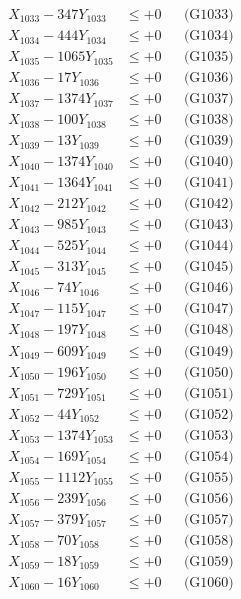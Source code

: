 \documentclass[a4paper,10pt]{article}
\begin{document}
{\begin{align}
X_{1033} - 347Y_{1033} &\leq +0 && \text{(G1033)} \\
X_{1034} - 444Y_{1034} &\leq +0 && \text{(G1034)} \\
X_{1035} - 1065Y_{1035} &\leq +0 && \text{(G1035)} \\
X_{1036} - 17Y_{1036} &\leq +0 && \text{(G1036)} \\
X_{1037} - 1374Y_{1037} &\leq +0 && \text{(G1037)} \\
X_{1038} - 100Y_{1038} &\leq +0 && \text{(G1038)} \\
X_{1039} - 13Y_{1039} &\leq +0 && \text{(G1039)} \\
X_{1040} - 1374Y_{1040} &\leq +0 && \text{(G1040)} \\
\allowbreak
X_{1041} - 1364Y_{1041} &\leq +0 && \text{(G1041)} \\
X_{1042} - 212Y_{1042} &\leq +0 && \text{(G1042)} \\
X_{1043} - 985Y_{1043} &\leq +0 && \text{(G1043)} \\
X_{1044} - 525Y_{1044} &\leq +0 && \text{(G1044)} \\
X_{1045} - 313Y_{1045} &\leq +0 && \text{(G1045)} \\
X_{1046} - 74Y_{1046} &\leq +0 && \text{(G1046)} \\
X_{1047} - 115Y_{1047} &\leq +0 && \text{(G1047)} \\
X_{1048} - 197Y_{1048} &\leq +0 && \text{(G1048)} \\
X_{1049} - 609Y_{1049} &\leq +0 && \text{(G1049)} \\
X_{1050} - 196Y_{1050} &\leq +0 && \text{(G1050)} \\
\allowbreak
X_{1051} - 729Y_{1051} &\leq +0 && \text{(G1051)} \\
X_{1052} - 44Y_{1052} &\leq +0 && \text{(G1052)} \\
X_{1053} - 1374Y_{1053} &\leq +0 && \text{(G1053)} \\
X_{1054} - 169Y_{1054} &\leq +0 && \text{(G1054)} \\
X_{1055} - 1112Y_{1055} &\leq +0 && \text{(G1055)} \\
X_{1056} - 239Y_{1056} &\leq +0 && \text{(G1056)} \\
X_{1057} - 379Y_{1057} &\leq +0 && \text{(G1057)} \\
X_{1058} - 70Y_{1058} &\leq +0 && \text{(G1058)} \\
X_{1059} - 18Y_{1059} &\leq +0 && \text{(G1059)} \\
X_{1060} - 16Y_{1060} &\leq +0 && \text{(G1060)} \\

\end{align}}
\end{document}
